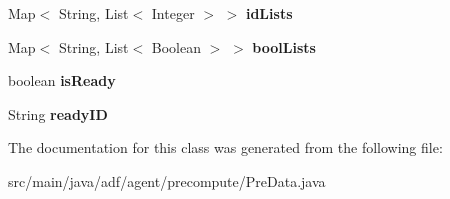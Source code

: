 \begin{DoxyCompactItemize}
Map$<$ String, List$<$ Integer $>$ $>$ {\bfseries id\+Lists}
\item 
\hypertarget{classadf_1_1agent_1_1precompute_1_1PreData_a2085142edc1e664e43922ce3963f4b0f}{}\label{classadf_1_1agent_1_1precompute_1_1PreData_a2085142edc1e664e43922ce3963f4b0f} 
Map$<$ String, List$<$ Boolean $>$ $>$ {\bfseries bool\+Lists}
\item 
\hypertarget{classadf_1_1agent_1_1precompute_1_1PreData_ad35a114c17b59c4102b9a24f19a84890}{}\label{classadf_1_1agent_1_1precompute_1_1PreData_ad35a114c17b59c4102b9a24f19a84890} 
boolean {\bfseries is\+Ready}
\item 
\hypertarget{classadf_1_1agent_1_1precompute_1_1PreData_a7902f6fc367e2a842ffde5d29a469940}{}\label{classadf_1_1agent_1_1precompute_1_1PreData_a7902f6fc367e2a842ffde5d29a469940} 
String {\bfseries ready\+ID}
\end{DoxyCompactItemize}


The documentation for this class was generated from the following file\+:\begin{DoxyCompactItemize}
\item 
src/main/java/adf/agent/precompute/Pre\+Data.\+java\end{DoxyCompactItemize}
